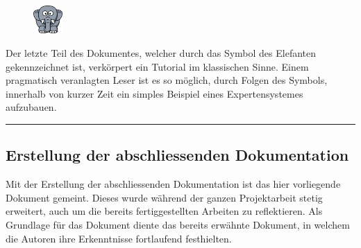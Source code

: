 \vspace{30pt}

\begin{figure}
    \vspace{-18pt}
    \includegraphics[width=0.1\textwidth]{bilder/elephant.png}\protect\footnotemark
\end{figure}
Der letzte Teil des Dokumentes, welcher durch das Symbol des Elefanten gekennzeichnet ist, verkörpert ein Tutorial im klassischen Sinne. Einem pragmatisch veranlagten Leser ist es so möglich, durch Folgen des Symbols, innerhalb von kurzer Zeit ein simples Beispiel eines Expertensystemes aufzubauen.

\noindent\rule[1ex]{\textwidth}{1pt}

\subsection{Erstellung der abschliessenden Dokumentation}
\label{subsec:abschliessende_dokumentation}
Mit der Erstellung der abschliessenden Dokumentation ist das hier vorliegende Dokument gemeint. Dieses wurde während der ganzen Projektarbeit stetig erweitert, auch um die bereits fertiggestellten Arbeiten zu reflektieren. Als Grundlage für das Dokument diente das bereits erwähnte Dokument, in welchem die Autoren ihre Erkenntnisse fortlaufend festhielten.
